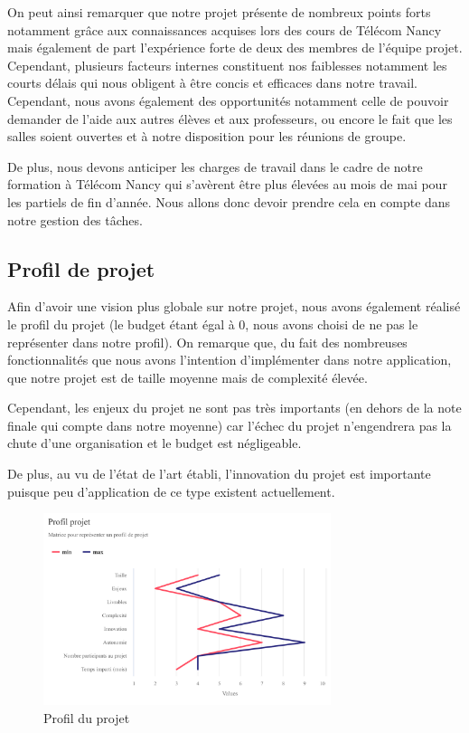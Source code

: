 \documentclass[french,a4paper]{article}
\begin{document}
On peut ainsi remarquer que notre projet présente de nombreux points forts notamment grâce aux connaissances acquises lors des cours de Télécom Nancy 
mais également de part l’expérience forte de deux des membres de l’équipe projet.  Cependant, plusieurs facteurs internes constituent nos faiblesses
 notamment les courts délais qui nous obligent à être concis et efficaces dans notre travail. Cependant, nous avons également des opportunités notamment 
 celle de pouvoir demander de l'aide aux autres élèves et aux professeurs, ou encore le fait que les salles soient ouvertes et à notre disposition pour
 les réunions de groupe.

De plus, nous devons anticiper les charges de travail dans le cadre de notre formation à Télécom Nancy qui s'avèrent être plus élevées au mois de mai 
pour les partiels de fin d'année. Nous allons donc devoir prendre cela en compte dans notre gestion des tâches.

\subsection{Profil de projet}

Afin d’avoir une vision plus globale sur notre projet, nous avons également réalisé le profil du projet (le budget étant égal à 0, nous avons choisi de ne pas le représenter dans notre profil). On remarque que, du fait des nombreuses fonctionnalités que nous avons l’intention d’implémenter dans notre application, que notre projet est de taille moyenne mais de complexité élevée.

Cependant, les enjeux du projet ne sont pas très importants (en dehors de la note finale qui compte dans notre moyenne) car l'échec du projet n'engendrera pas la chute d'une organisation et le budget est négligeable.

De plus, au vu de l’état de l’art établi, l’innovation du projet est importante puisque peu d'application de ce type existent actuellement.

\begin{figure}[H]
    \centering
    \includegraphics[width=0.75\textwidth]{img/profil_projet.png}
    \caption{Profil du projet}
\end{figure}
\end{document}

